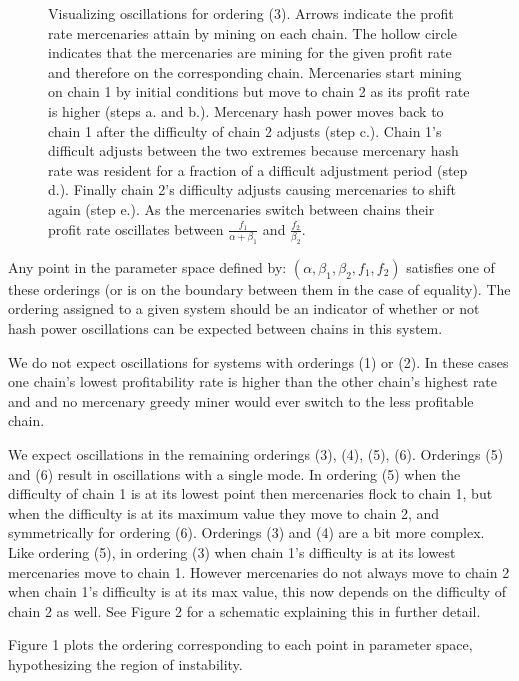 \documentclass[10pt, preprint]{aastex}
\begin{document}
\begin{figure}
\begin{tikzpicture}[scale=1]
\end{tikzpicture}
\caption{Visualizing oscillations for ordering (3). Arrows indicate the profit rate mercenaries attain by mining on each chain.  The hollow circle indicates that the mercenaries are mining for the given profit rate and therefore on the corresponding chain.  Mercenaries start mining on chain 1 by initial conditions but move to chain 2 as its profit rate is higher (steps a. and b.).  Mercenary hash power moves back to chain 1 after the difficulty of chain 2 adjusts (step c.).  Chain 1's difficult adjusts between the two extremes because mercenary hash rate was resident for a fraction of a difficult adjustment period (step d.).  Finally chain 2's difficulty adjusts causing mercenaries to shift again (step e.).  As the mercenaries switch between chains their profit rate oscillates between $\frac{f_1}{\alpha + \beta_1}$ and $\frac{f_2}{\beta_2} $.}
\label{fig:osc-diagram}
\end{figure}


Any point in the parameter space defined by: $(\alpha, \beta_1, \beta_2, f_1, f_2)$ satisfies one of these orderings (or is on the boundary between them in the case of equality).  The ordering assigned to a given system should be an indicator of whether or not hash power oscillations can be expected between chains in this system.  

We do not expect oscillations for systems with orderings (1) or (2).  In these cases one chain's lowest profitability rate is higher than the other chain's highest rate and and no mercenary greedy miner would ever switch to the less profitable chain.  

We expect oscillations in the remaining orderings (3), (4), (5), (6).  Orderings (5) and (6) result in oscillations with a single mode.  In ordering (5) when the difficulty of chain 1 is at its lowest point then mercenaries flock to chain 1, but when the difficulty is at its maximum value they move to chain 2, and symmetrically for ordering (6).  Orderings (3) and (4) are a bit more complex.  Like ordering (5), in ordering (3) when chain 1's difficulty is at its lowest mercenaries move to chain 1.  However mercenaries do not always move to chain 2 when chain 1's difficulty is at its max value, this now depends on the difficulty of chain 2 as well.  See Figure 2 for a schematic explaining this in further detail.

Figure 1 plots the ordering corresponding to each point in parameter space, hypothesizing the region of instability. 
\end{document}

